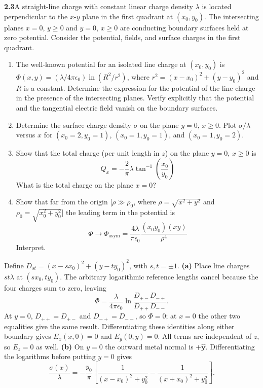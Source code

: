 \par\bigskip
\noindent\textbf{2.3}\quad A straight-line charge with constant linear charge density $\lambda$ is located perpendicular to the $x$-$y$ plane in the first quadrant at $(x_{0},y_{0})$. The intersecting planes $x=0$, $y\geq0$ and $y=0$, $x\geq0$ are conducting boundary surfaces held at zero potential. Consider the potential, fields, and surface charges in the first quadrant.
\begin{enumerate}
\item[(a)] The well-known potential for an isolated line charge at $(x_{0},y_{0})$ is $\Phi(x,y)=(\lambda/4\pi\epsilon_{0})\ln(R^{2}/r^{2})$, where $r^{2}=(x-x_{0})^{2}+(y-y_{0})^{2}$ and $R$ is a constant. Determine the expression for the potential of the line charge in the presence of the intersecting planes. Verify explicitly that the potential and the tangential electric field vanish on the boundary surfaces.
\item[(b)] Determine the surface charge density $\sigma$ on the plane $y=0$, $x\geq0$. Plot $\sigma/\lambda$ versus $x$ for $(x_{0}=2,y_{0}=1)$, $(x_{0}=1,y_{0}=1)$, and $(x_{0}=1,y_{0}=2)$.
\item[(c)] Show that the total charge (per unit length in $z$) on the plane $y=0$, $x\geq0$ is
\[
Q_{x} = -\frac{2}{\pi}\lambda\tan^{-1}\!\left(\frac{x_{0}}{y_{0}}\right)
\]
What is the total charge on the plane $x=0$?
\item[(d)] Show that far from the origin [$\rho\gg\rho_{0}$, where $\rho=\sqrt{x^{2}+y^{2}}$ and $\rho_{0}=\sqrt{x_{0}^{2}+y_{0}^{2}}$] the leading term in the potential is
\[
\Phi\rightarrow\Phi_{\mathrm{asym}}=\frac{4\lambda}{\pi\epsilon_{0}}\frac{(x_{0}y_{0})(xy)}{\rho^{4}}
\]
Interpret.
\end{enumerate}
\solution
Define $D_{st}=(x-sx_0)^2+(y-ty_0)^2$, with $s,t=\pm1$.
\textbf{(a)} Place line charges $st\lambda$ at $(sx_0,ty_0)$.
The arbitrary logarithmic reference lengths cancel because the
four charges sum to zero, leaving
\[
\boxed{\Phi=\frac{\lambda}{4\pi\epsilon _0}
 \ln\frac{D_{+-}D_{-+}}{D_{++}D_{--}}.}
\]
At $y=0$, $D_{++}=D_{+-}$ and $D_{-+}=D_{--}$, so $\Phi=0$;
at $x=0$ the other two equalities give the same result. Differentiating
these identities along either boundary gives $E_x(x,0)=0$ and
$E_y(0,y)=0$. All terms are independent of $z$, so $E_z=0$ as well.
\textbf{(b)} On $y=0$ the outward metal normal is $+\widehat{\mathbf y}$.
Differentiating the logarithms before putting $y=0$ gives
\[
\boxed{\frac{\sigma(x)}\lambda=-\frac{y_0}{\pi}
 \left[\frac1{(x-x_0)^2+y_0^2}-\frac1{(x+x_0)^2+y_0^2}\right].}
\]
